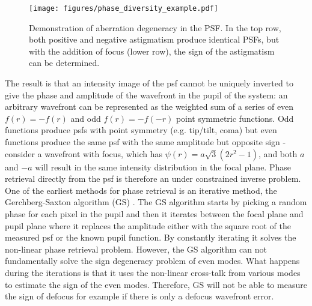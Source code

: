 \documentclass[letterpaper]{ar-1col}
\begin{document}
\begin{figure}[ht]
  \centering
  \texttt{[image: figures/phase\_diversity\_example.pdf]}
  \caption{Demonstration of aberration degeneracy in the PSF.
  In the top row, both positive and negative astigmatism produce identical PSFs, but with the addition of focus (lower row), the sign of the astigmatism can be determined.}
  \label{fig:degenerate}
\end{figure}

The result is that an intensity image of the \ac{psf} cannot be uniquely inverted to give the phase and amplitude of the wavefront in the pupil of the system: an arbitrary wavefront can be represented as the weighted sum of a series of even $f(r)=-f(r)$ and odd $f(r)=-f(-r)$ point symmetric functions.
%
Odd functions produce \acp{psf} with point symmetry (e.g. tip/tilt, coma) but even functions produce the same \ac{psf} with the same amplitude but opposite sign - consider a wavefront with focus, which has $\psi(r) = a\sqrt{3}(2r^2-1)$, and both $a$ and $-a$ will result in the same intensity distribution in the focal plane.
%
Phase retrieval directly from the \ac{psf} is therefore an under constrained inverse problem.
%
One of the earliest methods for phase retrieval is an iterative method, the Gerchberg-Saxton algorithm (GS) \citep{Gerchberg72}.
%
The GS algorithm starts by picking a random phase for each pixel in the pupil and then it iterates between the focal plane and pupil plane where it replaces the amplitude either with the square root of the measured \ac{psf} or the known  pupil function.
%
By constantly iterating it solves the non-linear phase retrieval problem.
%
However, the GS algorithm can not fundamentally solve the sign degeneracy problem of even modes.
%
What happens during the iterations is that it uses the non-linear cross-talk from various modes to estimate the sign of the even modes.
%
Therefore, GS will not be able to measure the sign of defocus for example if there is only a defocus wavefront error.
\end{document}

